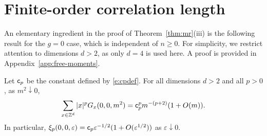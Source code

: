 \section{Finite-order correlation length}

An elementary ingredient in the proof of Theorem~\ref{thm:mr}(iii) is the following result
for the $g=0$ case, which is independent of $n\ge 0$.
For simplicity, we restrict attention to dimensions $d>2$, as only $d=4$ is used here.
A proof is provided in Appendix~\ref{app:free-moments}.

\begin{prop}\label{prop:Gab-free-moment-estimate}
Let ${\sf c}_p$ be the constant defined by \eqref{e:cpdef}.
For all dimensions $d>2$ and all $p>0$,
as $m^2 \downarrow 0$,
\begin{equation}
\label{e:Gab-free-moment-estimate}
\sum_{x\in{ {{\mathbb Z}}^d }} |x|^p G_{x}(0, 0, m^2)
=
{\sf c}_p^p m^{-(p + 2)} (1 + O(m)).
\end{equation}
In particular, $\xi_p(0,0,\varepsilon) = {\sf c}_p \varepsilon^{-1/2}
(1+O(\varepsilon^{1/2}))$ as $\varepsilon \downarrow 0$.
\end{prop}

